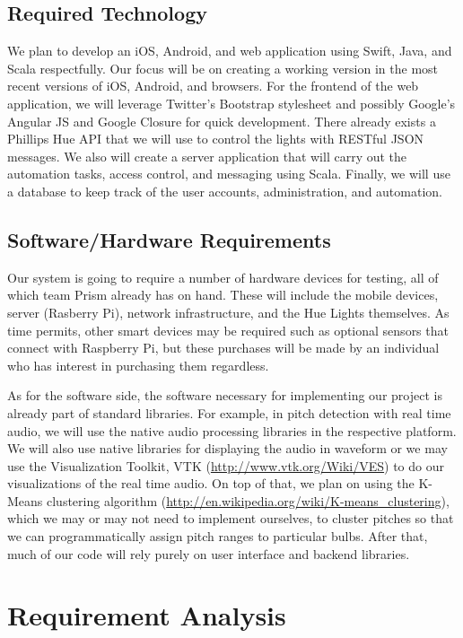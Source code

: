 \documentclass[12pt]{article}
\begin{document}
\subsection{Required Technology}
We plan to develop an iOS, Android, and web application using Swift, Java, and Scala respectfully.  Our focus will be on creating a working version in the most recent versions of iOS, Android, and browsers. For the frontend of the web application, we will leverage Twitter's Bootstrap stylesheet and possibly Google's Angular JS and Google Closure for quick development. There already exists a Phillips Hue API that we will use to control the lights with RESTful JSON messages.  We also will create a server application that will carry out the automation tasks, access control, and messaging using Scala. Finally, we will use a database to keep track of the user accounts, administration, and automation.

\subsection{Software/Hardware Requirements}
Our system is going to require a number of hardware devices for testing, all of which team Prism already has on hand.  These will include the mobile devices, server (Rasberry Pi), network infrastructure, and the Hue Lights themselves.  As time permits, other smart devices may be required such as optional sensors that connect with Raspberry Pi, but these purchases will be made by an individual who has interest in purchasing them regardless.

As for the software side, the software necessary for implementing our project is already part of standard libraries. For example, in pitch detection with real time audio, we will use the native audio processing libraries in the respective platform.  We will also use native libraries for displaying the audio in waveform or we may use the Visualization Toolkit, VTK (\url{http://www.vtk.org/Wiki/VES}) to do our visualizations of the real time audio. On top of that, we plan on using the K-Means clustering algorithm (\url{http://en.wikipedia.org/wiki/K-means_clustering}), which we may or may not need to implement ourselves, to cluster pitches so that we can programmatically assign pitch ranges to particular bulbs. After that, much of our code will rely purely on user interface and backend libraries.


\clearpage

\section{Requirement Analysis}
\end{document}
